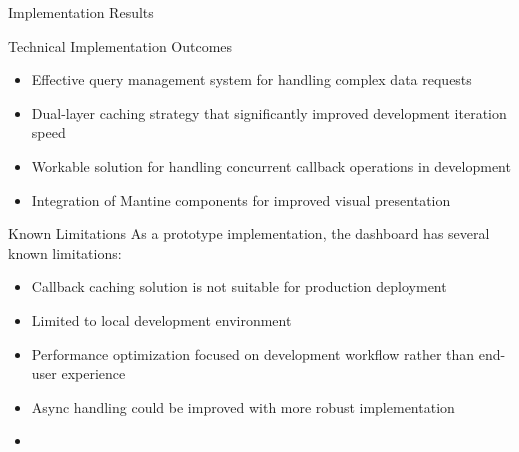 \begin{section}{Implementation Results}
\begin{subsection}{Technical Implementation Outcomes}
		\begin{itemize}
			\item Effective query management system for handling complex data requests
			\item Dual-layer caching strategy that significantly improved development iteration speed
			\item Workable solution for handling concurrent callback operations in development
			\item Integration of Mantine components for improved visual presentation
		\end{itemize}
	\end{subsection}

	\begin{subsection}{Known Limitations}
		\label{subsec:implementation-results-limitations}
		As a prototype implementation, the dashboard has several known limitations:

		\begin{itemize}
			\item Callback caching solution is not suitable for production deployment
			\item Limited to local development environment
			\item Performance optimization focused on development workflow rather than end-user experience
			\item Async handling could be improved with more robust implementation
			\item {}
		\end{itemize}
	\end{subsection}
\end{section}

